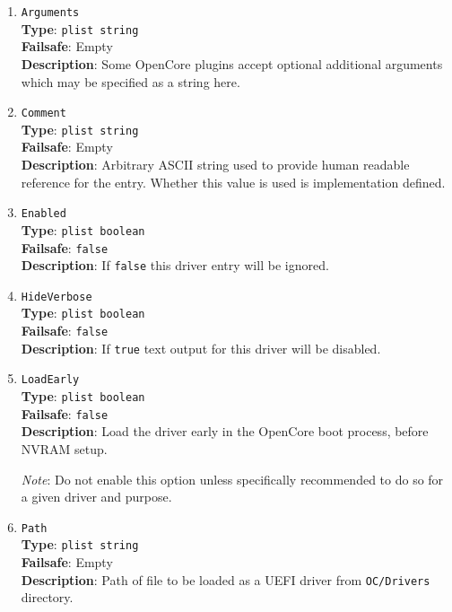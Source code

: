 \documentclass[]{article}
\begin{document}
\begin{enumerate}

\item
  \texttt{Arguments}\\
  \textbf{Type}: \texttt{plist\ string}\\
  \textbf{Failsafe}: Empty\\
  \textbf{Description}: Some OpenCore plugins accept optional additional arguments
  which may be specified as a string here.

\item
  \texttt{Comment}\\
  \textbf{Type}: \texttt{plist\ string}\\
  \textbf{Failsafe}: Empty\\
  \textbf{Description}: Arbitrary ASCII string used to provide human readable
  reference for the entry. Whether this value is used is implementation defined.

\item
  \texttt{Enabled}\\
  \textbf{Type}: \texttt{plist\ boolean}\\
  \textbf{Failsafe}: \texttt{false}\\
  \textbf{Description}: If \texttt{false} this driver entry will be ignored.

\item
  \texttt{HideVerbose}\\
  \textbf{Type}: \texttt{plist\ boolean}\\
  \textbf{Failsafe}: \texttt{false}\\
  \textbf{Description}: If \texttt{true} text output for this driver will be disabled.

\item
  \texttt{LoadEarly}\\
  \textbf{Type}: \texttt{plist\ boolean}\\
  \textbf{Failsafe}: \texttt{false}\\
  \textbf{Description}: Load the driver early in the OpenCore boot process, before NVRAM setup.

  \emph{Note}: Do not enable this option unless specifically recommended to do so for a
  given driver and purpose.

\item
  \texttt{Path}\\
  \textbf{Type}: \texttt{plist\ string}\\
  \textbf{Failsafe}: Empty\\
  \textbf{Description}: Path of file to be loaded as a UEFI driver
  from \texttt{OC/Drivers} directory.

\end{enumerate}
\end{document}
